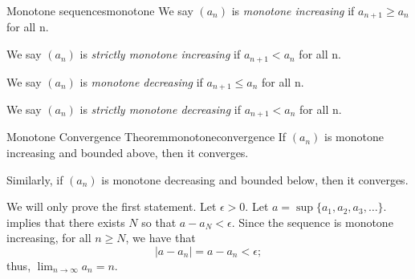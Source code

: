 
\begin{defn}{Monotone sequences}{monotone}
	We say \((a_n)\) is \emph{monotone increasing} if \(a_{n+1} \geq a_n\) for all n.

	We say \((a_n)\) is \emph{strictly monotone increasing} if \(a_{n+1} < a_n\) for all n.

	We say \((a_n)\) is \emph{monotone decreasing} if \(a_{n+1} \leq a_n\) for all n.

	We say \((a_n)\) is \emph{strictly monotone decreasing} if \(a_{n+1} < a_n\) for all n.
\end{defn}

\begin{thm}{Monotone Convergence Theorem}{monotoneconvergence}
	If \((a_n)\) is monotone increasing and bounded above, then it converges.
	
	Similarly, if \((a_n)\) is monotone decreasing and bounded below, then it converges.
\end{thm}

\begin{dem}{}{}
	We will only prove the first statement. Let \(\epsilon > 0\). Let \(a = \sup\{a_1, a_2, a_3, \dots\}\).  implies that there exists \(N\) so that \(a - a_N < \epsilon\). Since the sequence is monotone increasing, for all \(n \geq N\), we have that  \[
		|a - a_n| = a - a_n < \epsilon;
	\]
	thus, \(\lim_{n\to\infty} a_n = n\).
\end{dem}

